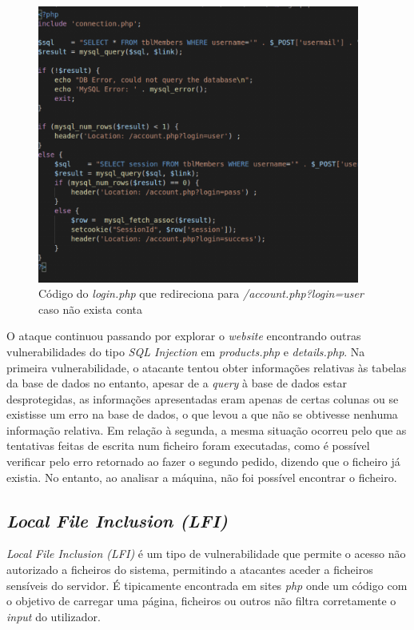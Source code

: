 \documentclass[10pt,english]{article}
\begin{document}
\begin{figure}[h]
    \centering
    \includegraphics[width=400]{images/loginphp.png}
    \caption{Código do \textit{login.php} que redireciona para \textit{/account.php?login=user} caso não exista conta}
\end{figure}

\par O ataque continuou passando por explorar o \textit{website} encontrando outras vulnerabilidades do tipo \textit{SQL Injection} em \textit{products.php} e \textit{details.php}. Na primeira vulnerabilidade, o atacante tentou obter informações relativas às tabelas da base de dados no entanto, apesar de a \textit{query} à base de dados estar desprotegidas, as informações apresentadas eram apenas de certas colunas ou se existisse um erro na base de dados, o que levou a que não se obtivesse nenhuma informação relativa. Em relação à segunda, a mesma situação ocorreu pelo que as tentativas feitas de escrita num ficheiro foram executadas, como é possível verificar pelo erro retornado ao fazer o segundo pedido, dizendo que o ficheiro já existia. No entanto, ao analisar a máquina, não foi possível encontrar o ficheiro. 

\subsection{\textit{Local File Inclusion (LFI)}}

\par \textit{Local File Inclusion (LFI)} é um tipo de vulnerabilidade que permite o acesso não autorizado a ficheiros do sistema, permitindo a atacantes aceder a ficheiros sensíveis do servidor. É tipicamente encontrada em sites \textit{php} onde um código com o objetivo de carregar uma página, ficheiros ou outros não filtra corretamente o \textit{input} do utilizador.
\end{document}
